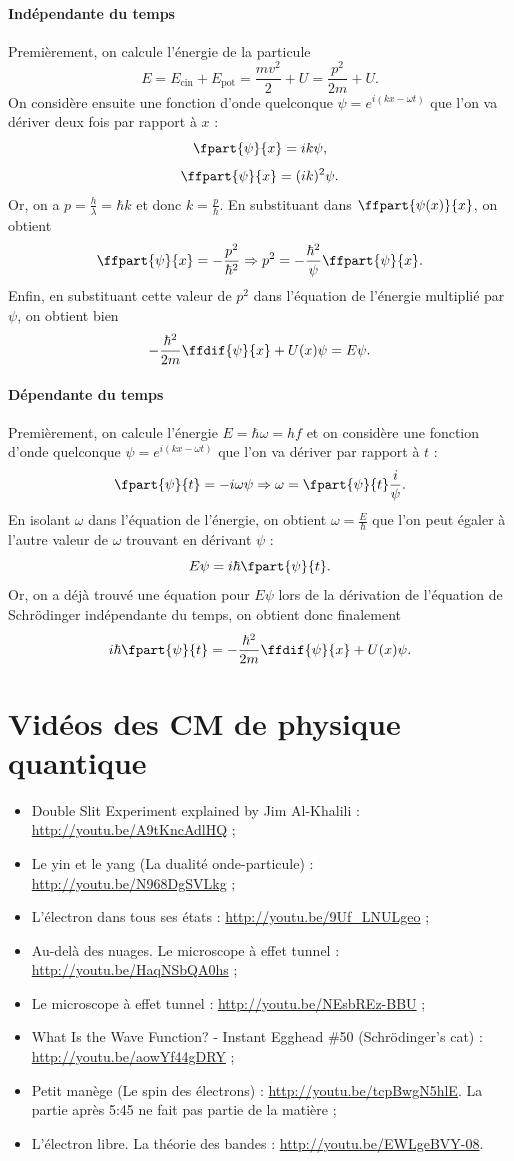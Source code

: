 \paragraph{Indépendante du temps}
Premièrement, on calcule l'énergie de la particule
\[ E = E_{\text{cin}} + E_{\text{pot}} = \frac{mv^2}{2} + U = \frac{p^2}{2m} + U.\]
On considère ensuite une fonction d'onde quelconque $\psi = e^{i(kx-\omega t)}$
que l'on va dériver deux fois par rapport à $x$ :
\[ \fpart{\psi}{x} = ik\psi ,\]
\[ \ffpart{\psi}{x} = (ik)^2\psi. \]
Or, on a $p = \frac{h}{\lambda} = \hbar k$ et donc $k = \frac{p}{\hbar}$.
En substituant dans $\ffpart{\psi(x)}{x}$, on obtient
\[ \ffpart{\psi}{x} = -\frac{p^2}{\hbar^2} \Rightarrow p^2 =
-\frac{\hbar^2}{\psi}\ffpart{\psi}{x}.\]
Enfin, en substituant cette valeur de $p^2$ dans l'équation de l'énergie
multiplié par $\psi$, on obtient bien
\[ -\frac{\hbar^2}{2m}\ffdif{\psi}{x} + U(x)\psi = E\psi.\]

\paragraph{Dépendante du temps}
Premièrement, on calcule l'énergie $E = \hbar\omega = hf$ et on
considère une fonction d'onde quelconque $\psi = e^{i(kx-\omega t)}$
que l'on va dériver par rapport à $t$ :
\[ \fpart{\psi}{t} = -i\omega\psi \Rightarrow \omega = \fpart{\psi}{t}\frac{i}{\psi}.\]
En isolant $\omega$ dans l'équation de l'énergie, on obtient $\omega = \frac{E}{\hbar}$
que l'on peut égaler à l'autre valeur de $\omega$ trouvant en dérivant $\psi$ :
\[ E\psi = i\hbar\fpart{\psi}{t}.\]
Or, on a déjà trouvé une équation pour $E\psi$ lors de la dérivation de l'équation
de Schrödinger indépendante du temps, on obtient donc finalement
\[ i\hbar\fpart{\psi}{t} = -\frac{\hbar^2}{2m}\ffdif{\psi}{x} + U(x)\psi.\]

\section{Vidéos des CM de physique quantique}
\label{sec:videos}
\begin{itemize}
	\item Double Slit Experiment explained by Jim Al-Khalili :
	\url{http://youtu.be/A9tKncAdlHQ} ;
	\item Le yin et le yang (La dualité onde-particule) :
	\url{http://youtu.be/N968DgSVLkg} ;
	\item L'électron dans tous ses états :
	\url{http://youtu.be/9Uf_LNULgeo} ;
	\item Au-delà des nuages. Le microscope à effet tunnel :
	\url{http://youtu.be/HaqNSbQA0hs} ;
	\item Le microscope à effet tunnel :
	\url{http://youtu.be/NEsbREz-BBU} ;
	\item What Is the Wave Function? - Instant Egghead \#50
	(Schrödinger's cat) : \url{http://youtu.be/aowYf44gDRY} ;
	\item Petit manège (Le spin des électrons) :
	\url{http://youtu.be/tcpBwgN5hlE}. La partie après 5:45
	ne fait pas partie de la matière ;
	\item L'électron libre. La théorie des bandes :
	\url{http://youtu.be/EWLgeBVY-08}.
\end{itemize}
